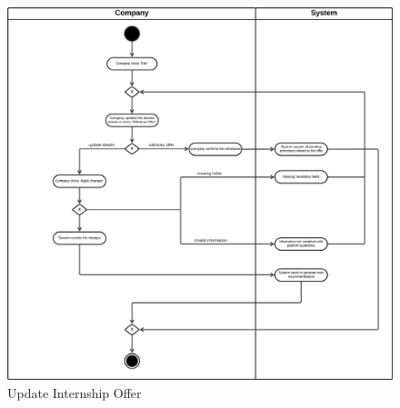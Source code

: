 \begin{figure}[H]
    \begin{center}
         \includegraphics[width=1\linewidth]{LaTeXCode/images/activity diagram/UC7.png}
         \caption{Update Internship Offer}
         \label{fig:update_internship_offer_ad}
     \end{center}
\end{figure}

\newpage

